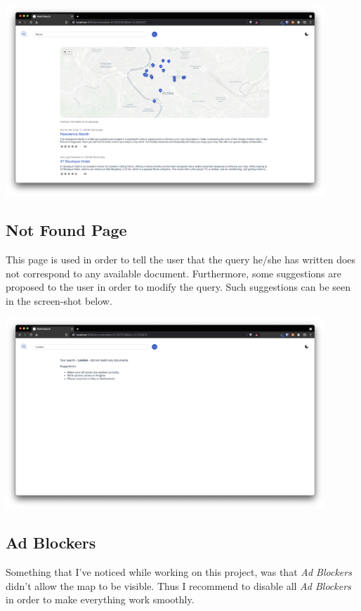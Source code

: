\documentclass[unicode,11pt,a4paper,oneside,numbers=endperiod,openany]{scrartcl}
\begin{document}
\begin{center}
	\includegraphics[width=12cm]{./results.png}
\end{center}

\subsection{Not Found Page}
This page is used in order to tell the user that the query he/she has written does not correspond to any available document. Furthermore, some suggestions are proposed to the user in order to modify the query. Such suggestions can be seen in the screen-shot below.

\begin{center}
	\includegraphics[width=12cm]{./not-found.png}
\end{center}

\subsection{Ad Blockers}
Something that I've noticed while working on this project, was that \textit{Ad Blockers} didn't allow the map to be visible. Thus I recommend to disable all \textit{Ad Blockers} in order to make everything work smoothly.
\end{document}
